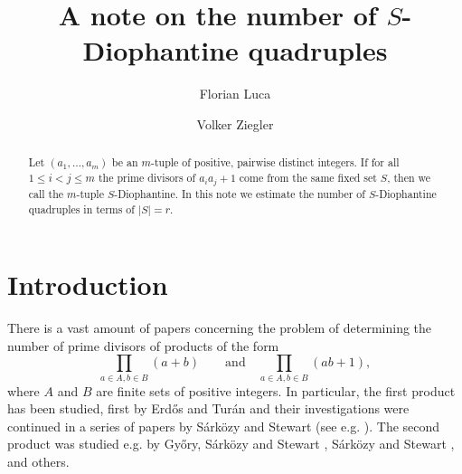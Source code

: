 \documentclass{amsart}
\theoremstyle{remark}
\begin{document}
\title[A note the number of $S$-Diophantine quadruples]{A note on the number of $S$-Diophantine quadruples}
 

\author[F. Luca]{Florian Luca}
\address{F. Luca\newline
\indent Mathematical Institute, UNAM Juriquilla\newline
\indent Juriquilla, 76230 Santiago de Quer\'etaro\newline
\indent Quer\'etaro de Arteaga, M\'exico\newline
\indent and\newline
\indent School of Mathematics\newline
\indent University of the Witwatersrand\newline
\indent P. O. Box Wits 2050, South Africa}

\author[V. Ziegler]{Volker Ziegler}
\address{V. Ziegler\newline
\indent Johann Radon Institute for Computational and Applied Mathematics (RICAM)\newline
\indent Austrian Academy of Sciences\newline
\indent Altenbergerstr. 69\newline
\indent A-4040 Linz, Austria}

\begin{abstract}
Let $(a_1,\dots, a_m)$ be an $m$-tuple of positive, pairwise distinct integers. If for all $1\leq i< j \leq m$ the prime divisors of $a_ia_j+1$ come from 
the same fixed set $S$, then we call the $m$-tuple $S$-Diophantine. In this note we estimate the number of $S$-Diophantine quadruples in terms of $|S|=r$.
\end{abstract}

\maketitle

\section{Introduction}

There is a vast amount of papers concerning the problem of determining the number of prime divisors of products of the form
$$
\prod_{a \in A, b \in B} (a+b) \qquad \text{and} \quad \prod_{a \in A, b \in B} (ab+1),
$$
where $A$ and $B$ are finite sets of positive integers. In particular, the first product has been studied, first by Erd\H{o}s and Tur\'an \cite{Erdos:1934} 
and their investigations were continued in a series of papers by S\'ark\"ozy and Stewart (see e.g. \cite{Sarkozy:1986,Sarkozy:1994}).
The second product was studied e.g. by Gy\H{o}ry, S\'ark\"ozy and Stewart \cite{Gyory:1996}, S\'ark\"ozy and Stewart \cite{Sarkozy:2000}, and others. 
\end{document}
